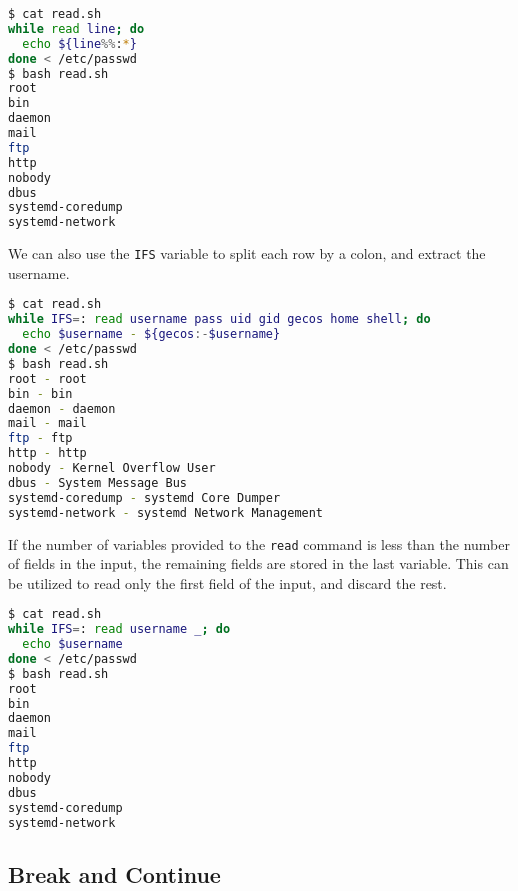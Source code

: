 \begin{lstlisting}[language=bash]
$ cat read.sh
while read line; do
  echo ${line%%:*}
done < /etc/passwd
$ bash read.sh
root
bin
daemon
mail
ftp
http
nobody
dbus
systemd-coredump
systemd-network
\end{lstlisting}

We can also use the \lstinline{IFS} variable to split each row by a colon, and extract the username.

\begin{lstlisting}[language=bash]
$ cat read.sh
while IFS=: read username pass uid gid gecos home shell; do
  echo $username - ${gecos:-$username}
done < /etc/passwd
$ bash read.sh
root - root
bin - bin
daemon - daemon
mail - mail
ftp - ftp
http - http
nobody - Kernel Overflow User
dbus - System Message Bus
systemd-coredump - systemd Core Dumper
systemd-network - systemd Network Management
\end{lstlisting}

If the number of variables provided to the \lstinline|read| command is less than the number of fields in the input, the remaining fields are stored in the last variable.
This can be utilized to read only the first field of the input, and discard the rest.

\begin{lstlisting}[language=bash]
$ cat read.sh
while IFS=: read username _; do
  echo $username
done < /etc/passwd
$ bash read.sh
root
bin
daemon
mail
ftp
http
nobody
dbus
systemd-coredump
systemd-network
\end{lstlisting}

\subsection{Break and Continue}

